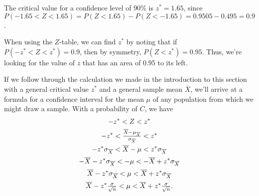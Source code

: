 \begin{center}
\end{center}
\begin{examp}
The critical value for a confidence level of $90\%$ is $z^* = 1.65$, since $P(-1.65 < Z < 1.65) = P(Z < 1.65) - P(Z < -1.65) = 0.9505 - 0.495 = 0.9$.
\begin{center}
\end{center}
When using the $Z$-table, we can find $z^*$ by noting that if $P(-z^* < Z < z^*) = 0.9$, then by symmetry, $P(Z < z^*) = 0.95$. Thus, we're looking for the value of $z$ that has an area of 0.95 to its left.
\end{examp}
\par
If we follow through the calculation we made in the introduction to this section with a general critical value $z^*$ and a general sample mean $\overline{X}$, we'll arrive at a formula for a confidence interval for the mean $\mu$ of any population from which we might draw a sample. With a probability of $C$, we have
\begin{gather*}
-z^* < Z < z^* \\
-z^* < \textstyle\frac{\overline{X}- \mu_{\overline{X}}}{\sigma_{\overline{X}}} < z^* \\
-z^* \sigma_{\overline{X}} < \overline{X}- \mu < z^* \sigma_{\overline{X}} \\[0.2ex]
-\overline{X}-z^* \sigma_{\overline{X}} < - \mu < -\overline{X}+z^* \sigma_{\overline{X}} \\[0.3ex]
\overline{X}-z^* \sigma_{\overline{X}} <  \mu < \overline{X}+z^* \sigma_{\overline{X}} \\[0.3ex]
\overline{X}-z^* \textstyle\frac{\sigma}{\sqrt{n}} <  \mu < \overline{X}+z^* 
\frac{\sigma}{\sqrt{n}}.
\end{gather*}
